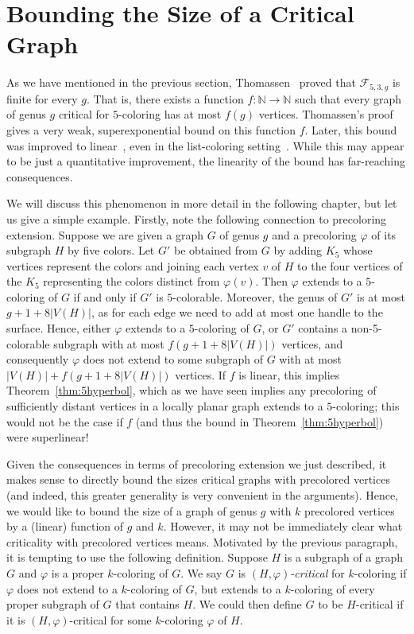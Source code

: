 \documentclass[12pt,twoside,openright,a4paper]{book}
\newcommand{\FF}{\mathcal{F}}
\begin{document}
\section{Bounding the Size of a Critical Graph}

As we have mentioned in the previous section, Thomassen~\cite{Thomassen97} proved that $\FF_{5,3,g}$ is finite for every $g$.
That is, there exists a function $f:\mathbb{N}\to\mathbb{N}$ such that every graph of genus $g$ critical for $5$-coloring
has at most $f(g)$ vertices.  Thomassen's proof gives a very weak, superexponential bound on this function $f$.
Later, this bound was improved to linear~\cite{pothom}, even in the list-coloring setting~\cite{lukethe}.
While this may appear to be just a quantitative improvement, the linearity of the bound has far-reaching consequences.

We will discuss this phenomenon in more detail in the following chapter, but let us give a simple example.
Firstly, note the following connection to precoloring extension.  Suppose we are given a graph $G$ of genus $g$
and a precoloring $\varphi$ of its subgraph $H$ by five colors.  Let $G'$ be obtained from $G$ by adding $K_5$
whose vertices represent the colors and joining each vertex $v$ of $H$ to the four vertices of the $K_5$ representing
the colors distinct from $\varphi(v)$.  Then $\varphi$ extends to a $5$-coloring of $G$ if and only if $G'$ is $5$-colorable.
Moreover, the genus of $G'$ is at most $g+1+8|V(H)|$, as for each edge we need to add at most one handle to the surface.
Hence, either $\varphi$ extends to a $5$-coloring of $G$, or $G'$ contains a non-5-colorable subgraph with at most $f(g+1+8|V(H)|)$
vertices, and consequently $\varphi$ does not extend to some subgraph of $G$ with at most $|V(H)|+f(g+1+8|V(H)|)$ vertices.
If $f$ is linear, this implies Theorem~\ref{thm:5hyperbol}, which as we have seen implies any precoloring of sufficiently
distant vertices in a locally planar graph extends to a $5$-coloring; this would not be the case if $f$ (and thus the bound in Theorem~\ref{thm:5hyperbol})
were superlinear!

Given the consequences in terms of precoloring extension we just described, it makes sense to directly
bound the sizes critical graphs with precolored vertices (and indeed, this greater generality is very
convenient in the arguments).  Hence, we would like to bound the size of a graph of genus $g$
with $k$ precolored vertices by a (linear) function of $g$ and $k$.
However, it may not be immediately clear what criticality with precolored vertices means.
Motivated by the previous paragraph, it is tempting to use the following definition.
Suppose $H$ is a subgraph of a graph $G$ and $\varphi$ is a proper $k$-coloring of $G$.
We say $G$ is \emph{$(H,\varphi)$-critical} for $k$-coloring if $\varphi$ does not extend to a $k$-coloring of $G$,
but extends to a $k$-coloring of every proper subgraph of $G$ that contains $H$.
We could then define $G$ to be $H$-critical if it is $(H,\varphi)$-critical for some $k$-coloring $\varphi$ of $H$.
\end{document}
